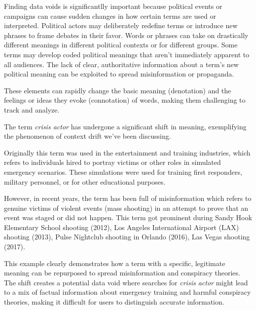 Finding data voids is significantlly important because
political events or campaigns can cause sudden changes in how certain terms are used or interpreted.
Political actors may deliberately redefine terms or introduce new phrases to frame debates in their favor.
Words or phrases can take on drastically different meanings in different political contexts or for different groups.
Some terms may develop coded political meanings that aren't immediately apparent to all audiences.
The lack of clear, authoritative information about a term's new political meaning can be exploited to spread misinformation or propaganda.

These elements can rapidly change the basic meaning (denotation) and the feelings or ideas they evoke (connotation) of words, making them challenging to track and analyze.

The term \emph{crisis actor} has undergone a significant shift in meaning,
exemplifying the phenomenon of context drift we've been discussing.

Originally this term was used in the entertainment and training industries,
which refers to individuals hired to portray victims or other roles in simulated emergency scenarios.
These simulations were used for training first responders, military personnel, or for other educational purposes.

However, in recent years, the term has been full of misinformation which refers to genuine victims of violent events (mass shooting) in an attempt to prove that an event was staged or did not happen.
This term got prominent during Sandy Hook Elementary School shooting (2012), Los Angeles International Airport (LAX) shooting (2013), Pulse Nightclub shooting in Orlando (2016), Las Vegas shooting (2017).

This example clearly demonstrates how a term with a specific, legitimate meaning can be repurposed to spread misinformation and conspiracy theories.
The shift creates a potential data void where searches for \emph{crisis actor} might lead to a mix of factual information about emergency training and harmful conspiracy theories,
making it difficult for users to distinguish accurate information.